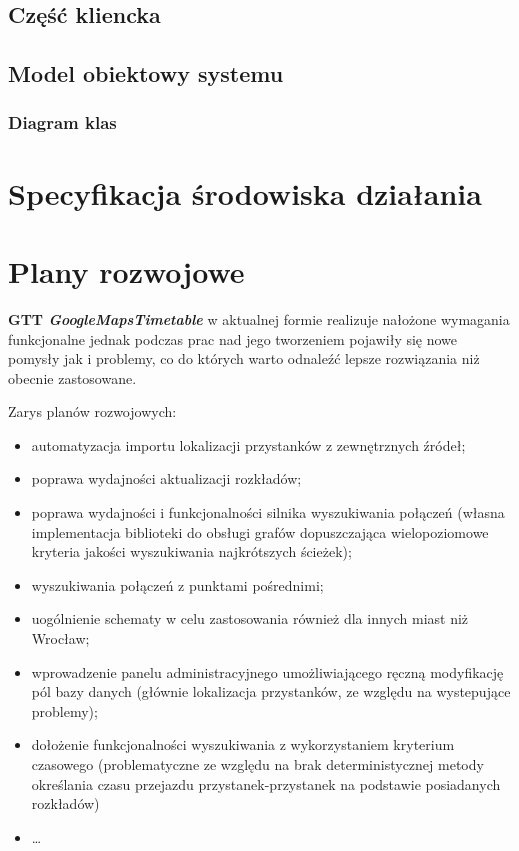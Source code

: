 \documentclass[a4paper,12pt]{article}
\begin{document}
\subsection{Część kliencka}

\subsection{Model obiektowy systemu}
\subsubsection{Diagram klas}

\section{Specyfikacja środowiska działania}

\section{Plany rozwojowe} 

 \textbf{GTT \emph{GoogleMapsTimetable}} w aktualnej formie realizuje nałożone
 wymagania funkcjonalne jednak podczas prac nad jego tworzeniem pojawiły się
 nowe pomysły jak i problemy, co do których warto odnaleźć lepsze rozwiązania
 niż obecnie zastosowane.
 
 Zarys planów rozwojowych:
 
 \begin{itemize}
   \item automatyzacja importu lokalizacji przystanków z zewnętrznych źródeł;
   \item poprawa wydajności aktualizacji rozkładów;
   \item poprawa wydajności i funkcjonalności silnika wyszukiwania połączeń
   (własna implementacja biblioteki do obsługi grafów dopuszczająca
   wielopoziomowe kryteria jakości wyszukiwania najkrótszych ścieżek);
   \item wyszukiwania połączeń z punktami pośrednimi;
   \item uogólnienie schematy w celu zastosowania również dla innych miast niż
   Wrocław;
   \item wprowadzenie panelu administracyjnego umożliwiającego ręczną
   modyfikację pól bazy danych (głównie lokalizacja przystanków, ze względu na
   wystepujące problemy);
   \item dołożenie funkcjonalności wyszukiwania z wykorzystaniem
   kryterium czasowego (problematyczne ze względu na brak deterministycznej
   metody określania czasu przejazdu przystanek-przystanek na podstawie posiadanych rozkładów)
   \item \ldots
 \end{itemize}
\end{document}
